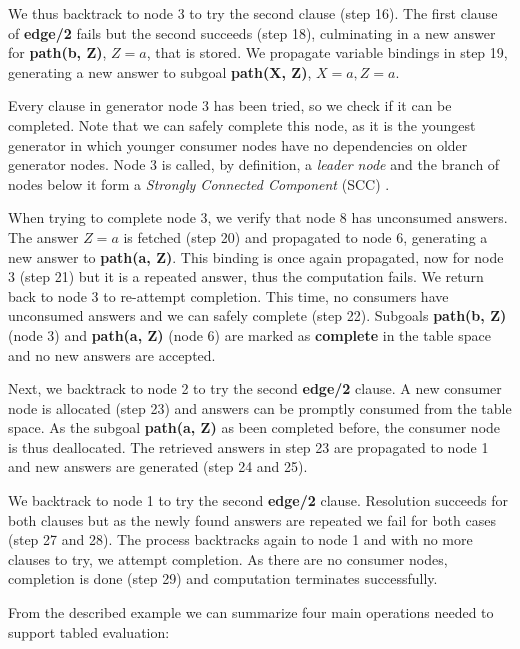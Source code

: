 We thus backtrack to node 3
to try the second clause (step 16). The first clause of \textbf{edge/2} fails but the second succeeds (step 18), culminating in
a new answer for \textbf{path(b, Z)}, $Z = a$, that is stored. We propagate variable bindings in step 19, generating a new answer
to subgoal \textbf{path(X, Z)}, $X = a, Z = a$.

Every clause in generator node 3 has been tried, so we check if it can be completed. Note that we can safely complete this node,
as it is the youngest generator in which younger consumer nodes have no dependencies on older generator nodes.
Node 3 is called, by definition, a \textit{leader node} and the branch of nodes
below it form a \textit{Strongly Connected Component} (SCC) \cite{Tarjan-72}.

When trying to complete node 3, we verify that node 8 has unconsumed answers. The answer $Z = a$ is fetched (step 20) and propagated
to node 6, generating a new answer to \textbf{path(a, Z)}. This binding is once again propagated, now for node 3 (step 21) but it is
a repeated answer, thus the computation fails. We return back to node 3 to re-attempt completion. This time, no consumers have unconsumed
answers and we can safely complete (step 22). Subgoals \textbf{path(b, Z)} (node 3) and \textbf{path(a, Z)} (node 6) are marked as \textbf{complete}
in the table space and no new answers are accepted.

Next, we backtrack to node 2 to try the second \textbf{edge/2} clause. A new consumer node is allocated (step 23) and answers can be
promptly consumed from the table space. As the subgoal \textbf{path(a, Z)} as been completed before, the consumer node is thus deallocated.
The retrieved answers in step 23 are propagated to node 1 and new answers are generated (step 24 and 25).

We backtrack to node 1 to try the second \textbf{edge/2} clause. Resolution succeeds for both clauses but as the newly found answers
are repeated we fail for both cases (step 27 and 28). The process backtracks again to node 1 and with no more clauses to try,
we attempt completion. As there are no consumer nodes, completion is done (step 29) and computation terminates successfully.

From the described example we can summarize four main operations needed to support tabled evaluation:

